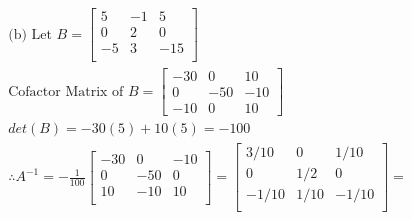 \documentclass[12pt, a4paper]{article}
\begin{document}
\begin{gather*}
  \text{(b) Let } B = 
  \left[ \begin{array}{ccc}
    5 & -1 & 5 \\
    0 & 2 & 0 \\
    -5 & 3 & -15 \\
  \end{array} \right] \\[5pt]
  \text{Cofactor Matrix of } B = 
  \left[ \begin{array}{ccc}
    -30 & 0 & 10 \\
    0 & -50 & -10 \\
    -10 & 0 & 10
  \end{array} \right] \\[5pt]
  det(B) = -30(5) + 10(5) = -100 \\[5pt]
  \therefore A^{-1} = -\frac{1}{100}
  \left[ \begin{array}{ccc}
    -30 & 0 & -10 \\
    0 & -50 & 0 \\
    10 & -10 & 10 \\
  \end{array} \right] = 
  \left[ \begin{array}{ccc}
    3/10 & 0 & 1/10 \\
    0 & 1/2 & 0 \\
    -1/10 & 1/10 & -1/10 \\
  \end{array} \right] = 
\end{gather*}
\end{document}
